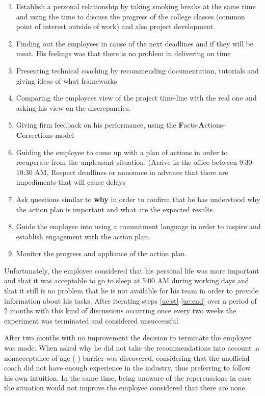 \begin{enumerate}
\item Establish a personal relationship by taking smoking breaks at the same time and using the time to discuss the progress of the college classes (common point of interest outside of work) and also project development.
\item Finding out the employees in cause of the next deadlines and if they will be meat. His feelings was that there is no problem in delivering on time
\item\label{uc:st} Presenting technical coaching by recommending documentation, tutorials and giving ideas of what frameworks 
\item Comparing the employees view of the project time-line with the real one and asking his view on the discrepancies.
\item Giving firm feedback on his performance, using the \textbf{F}acts-\textbf{A}ctions-\textbf{C}orrections model \cite{abur-pm}
\item Guiding the employee to come up with a plan of actions in order to recuperate from the unpleasant situation. (Arrive in the office between 9:30-10:30 AM, Respect deadlines or announce in advance that there are impediments that will cause delays
\item Ask questions similar to \textbf{why} in order to confirm that he has understood why the action plan is important and what are the expected results.
\item\label{uc:end} Guide the employee into using a commitment language \cite{notes-to-a-software-team-leader} in order to inspire and establish engagement with the action plan.
\item Monitor the progress and appliance of the action plan.
\end{enumerate}

Unfortunately, the employee considered that his personal life was more important and that it was acceptable to go to sleep at 5:00 AM during working days and that it still is no problem that he is not available for his team in order to provide information about his tasks. After iterating steps \ref{uc:st}-\ref{uc:end} over a period of 2 months with this kind of discussions occurring once every two weeks the experiment was terminated and considered unsuccessful.

After two months with no improvement the decision to terminate the employee was made. When asked why he did not take the recommendations into account ,a nonacceptance of age ( ) barrier was discovered, considering that the unofficial coach did not have enough experience in the industry, thus preferring to follow his own intuition. In the same time, being unaware of the repercussions in case the situation would not improve the employee considered  that there are none.


